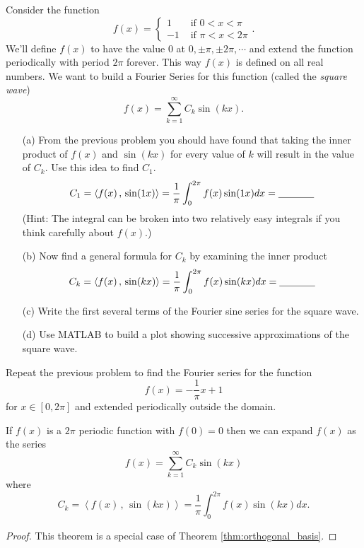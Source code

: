 \begin{problem}
    Consider the function 
    \[ f(x) = \left\{ \begin{array}{cl} 1 & \text{ if } 0 < x < \pi \\ -1 & \text{ if }
            \pi < x < 2\pi \end{array} \right..\]
    We'll define $f(x)$ to have the value 0 at $0, \pm \pi, \pm 2\pi, \cdots$ and extend
    the function periodically with period $2\pi$ forever.  This way $f(x)$ is defined on
    all real numbers. 
    We want to build a Fourier Series for this function (called the {\it square wave})
    \[ f(x) = \sum_{k=1}^\infty C_k \sin(kx). \]
    \begin{enumerate}
        \item[(a)] From the previous problem you should have found that taking the inner
            product of $f(x)$ and $\sin(kx)$ for every value of $k$ will result in the
            value of $C_k$.  Use this idea to find $C_1$. 
            \[ C_1 = \left< f(x) \, , \, \sin(1x) \right> = \frac{1}{\pi} \int_0^{2\pi}
            f(x) \sin(1x) dx = \underline{\hspace{0.5in}} \]
            (Hint: The integral can be broken into two relatively easy integrals if you think carefully about
            $f(x)$.)
        \item[(b)] Now find a general formula for $C_k$ by examining the inner product
            \[ C_k = \left< f(x) \, , \, \sin(kx) \right> = \frac{1}{\pi} \int_0^{2\pi} f(x)
            \sin(kx) dx = \underline{\hspace{0.5in}} \]
        \item[(c)] Write the first several terms of the Fourier sine series for the square
            wave.
        \item[(d)] Use MATLAB to build a plot showing successive approximations of the
            square wave.
    \end{enumerate}
\end{problem}

\begin{problem}
    Repeat the previous problem to find the Fourier series for the function 
    \[ f(x) = -\frac{1}{\pi}x + 1 \]
    for $x \in [0,2\pi]$ and extended periodically outside the domain.
\end{problem}

\begin{thm}
    If $f(x)$ is a $2\pi$ periodic function with $f(0) =0$ then we can expand $f(x)$ as
    the series 
    \[ f(x) = \sum_{k=1}^\infty C_k \sin(kx) \]
    where 
    \[ C_k = \left< f(x) \, , \, \sin(kx) \right> = \frac{1}{\pi} \int_0^{2\pi} f(x)
    \sin(kx) dx. \]
\end{thm}
\begin{proof}
    This theorem is a special case of Theorem \ref{thm:orthogonal_basis}.
\end{proof}

